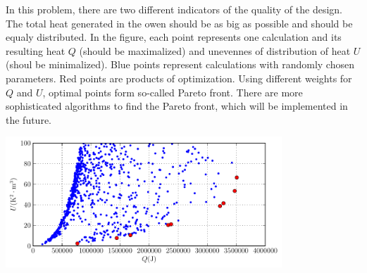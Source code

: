 \documentclass[portrait, a1paper, fontscale=0.5]{baposter}
\begin{document}
\begin{poster}
{\begin{center}
	\begin{minipage}{22em}
		In this problem, there are two different indicators of the quality of the design. The total heat generated in the  owen should be as big as possible and should be equaly distributed. In the figure, each point represents one calculation and its resulting heat $Q$ (should be maximalized) and unevennes of distribution of heat $U$ (shoul be minimalized). Blue points represent calculations with randomly chosen parameters. Red points are products of optimization. Using different weights for $Q$ and $U$, optimal points form so-called Pareto front. There are more sophisticated algorithms to find the Pareto front, which will be implemented in the future.
	\end{minipage}
	\begin{minipage}{28em}
		\centering
		\includegraphics[width=28em]{optimization/results.pdf}
	\end{minipage}
\end{center}
}


\end{poster}
\end{document}
